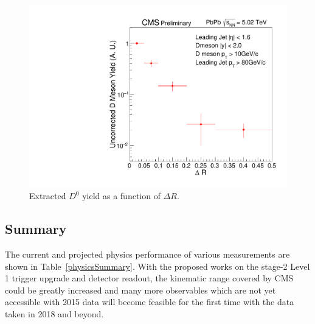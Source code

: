 \begin{figure}[!ht]
\begin{center}
\includegraphics[width=.49\textwidth]{DJetPlots/PrelimYield.pdf}
\caption{Extracted $D^0$ yield as a function of $\Delta R$.}
\label{fig:D0_JetYield}
\end{center}
\end{figure}


\subsection{Summary}

The current and projected physics performance of various measurements are shown in Table~\ref{physicsSummary}. With the proposed works on the stage-2 Level 1 trigger upgrade and detector readout, the kinematic range covered by CMS could be greatly increased and many more observables which are not yet accessible with 2015 data will become feasible for the first time with the data taken in 2018 and beyond.

